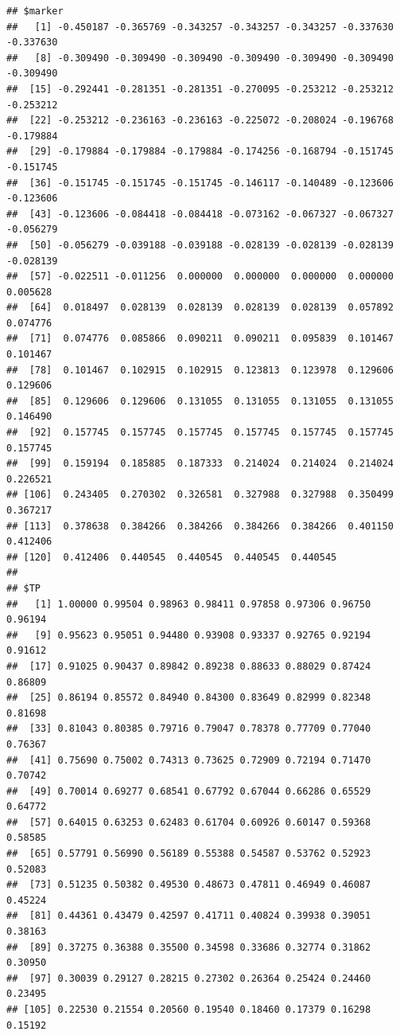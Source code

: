 \documentclass{article}\usepackage[]{graphicx}\usepackage[]{color}
\makeatletter
\newenvironment{kframe}{%
 \def\at@end@of@kframe{}%
 \ifinner\ifhmode%
  \def\at@end@of@kframe{\end{minipage}}%
  \begin{minipage}{\columnwidth}%
 \fi\fi%
 \def\FrameCommand##1{\hskip\@totalleftmargin \hskip-\fboxsep
 \colorbox{shadecolor}{##1}\hskip-\fboxsep
     \hskip-\linewidth \hskip-\@totalleftmargin \hskip\columnwidth}%
 \MakeFramed {\advance\hsize-\width
   \@totalleftmargin\z@ \linewidth\hsize
   \@setminipage}}%
 {\par\unskip\endMakeFramed%
 \at@end@of@kframe}
\newenvironment{knitrout}{}{} %
\makeatother
\begin{document}
\begin{knitrout}
{}


\begin{kframe}\begin{verbatim}
## $marker
##   [1] -0.450187 -0.365769 -0.343257 -0.343257 -0.343257 -0.337630 -0.337630
##   [8] -0.309490 -0.309490 -0.309490 -0.309490 -0.309490 -0.309490 -0.309490
##  [15] -0.292441 -0.281351 -0.281351 -0.270095 -0.253212 -0.253212 -0.253212
##  [22] -0.253212 -0.236163 -0.236163 -0.225072 -0.208024 -0.196768 -0.179884
##  [29] -0.179884 -0.179884 -0.179884 -0.174256 -0.168794 -0.151745 -0.151745
##  [36] -0.151745 -0.151745 -0.151745 -0.146117 -0.140489 -0.123606 -0.123606
##  [43] -0.123606 -0.084418 -0.084418 -0.073162 -0.067327 -0.067327 -0.056279
##  [50] -0.056279 -0.039188 -0.039188 -0.028139 -0.028139 -0.028139 -0.028139
##  [57] -0.022511 -0.011256  0.000000  0.000000  0.000000  0.000000  0.005628
##  [64]  0.018497  0.028139  0.028139  0.028139  0.028139  0.057892  0.074776
##  [71]  0.074776  0.085866  0.090211  0.090211  0.095839  0.101467  0.101467
##  [78]  0.101467  0.102915  0.102915  0.123813  0.123978  0.129606  0.129606
##  [85]  0.129606  0.129606  0.131055  0.131055  0.131055  0.131055  0.146490
##  [92]  0.157745  0.157745  0.157745  0.157745  0.157745  0.157745  0.157745
##  [99]  0.159194  0.185885  0.187333  0.214024  0.214024  0.214024  0.226521
## [106]  0.243405  0.270302  0.326581  0.327988  0.327988  0.350499  0.367217
## [113]  0.378638  0.384266  0.384266  0.384266  0.384266  0.401150  0.412406
## [120]  0.412406  0.440545  0.440545  0.440545  0.440545
## 
## $TP
##   [1] 1.00000 0.99504 0.98963 0.98411 0.97858 0.97306 0.96750 0.96194
##   [9] 0.95623 0.95051 0.94480 0.93908 0.93337 0.92765 0.92194 0.91612
##  [17] 0.91025 0.90437 0.89842 0.89238 0.88633 0.88029 0.87424 0.86809
##  [25] 0.86194 0.85572 0.84940 0.84300 0.83649 0.82999 0.82348 0.81698
##  [33] 0.81043 0.80385 0.79716 0.79047 0.78378 0.77709 0.77040 0.76367
##  [41] 0.75690 0.75002 0.74313 0.73625 0.72909 0.72194 0.71470 0.70742
##  [49] 0.70014 0.69277 0.68541 0.67792 0.67044 0.66286 0.65529 0.64772
##  [57] 0.64015 0.63253 0.62483 0.61704 0.60926 0.60147 0.59368 0.58585
##  [65] 0.57791 0.56990 0.56189 0.55388 0.54587 0.53762 0.52923 0.52083
##  [73] 0.51235 0.50382 0.49530 0.48673 0.47811 0.46949 0.46087 0.45224
##  [81] 0.44361 0.43479 0.42597 0.41711 0.40824 0.39938 0.39051 0.38163
##  [89] 0.37275 0.36388 0.35500 0.34598 0.33686 0.32774 0.31862 0.30950
##  [97] 0.30039 0.29127 0.28215 0.27302 0.26364 0.25424 0.24460 0.23495
## [105] 0.22530 0.21554 0.20560 0.19540 0.18460 0.17379 0.16298 0.15192

\end{verbatim}
\end{kframe}
\end{knitrout}
\end{document}
